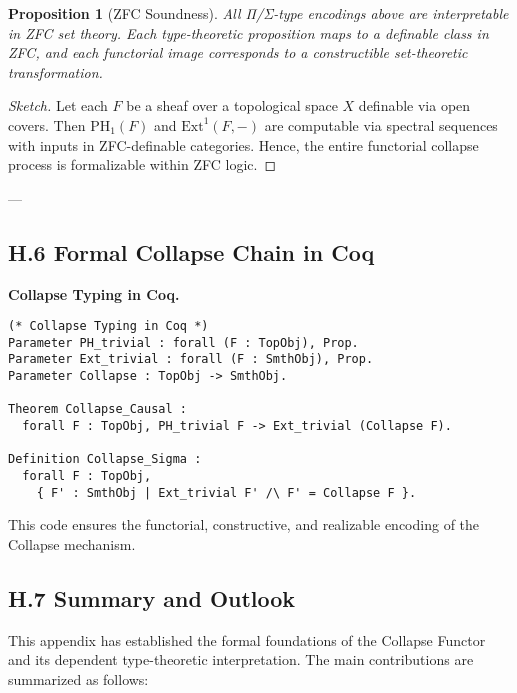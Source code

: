 \documentclass[11pt]{article}
\newtheorem{proposition}[theorem]{Proposition}
\begin{document}
\begin{proposition}[ZFC Soundness]
All Π/Σ-type encodings above are interpretable in ZFC set theory. Each type-theoretic proposition maps to a definable class in ZFC, and each functorial image corresponds to a constructible set-theoretic transformation.
\end{proposition}

\begin{proof}[Sketch]
Let each $F$ be a sheaf over a topological space $X$ definable via open covers. Then $\mathrm{PH}_1(F)$ and $\mathrm{Ext}^1(F,-)$ are computable via spectral sequences with inputs in ZFC-definable categories. Hence, the entire functorial collapse process is formalizable within ZFC logic.
\end{proof}

---

\subsection*{H.6 Formal Collapse Chain in Coq}

\textbf{Collapse Typing in Coq.}
\vspace{0.5em}

\begin{lstlisting}[language=Coq, mathescape=false]
(* Collapse Typing in Coq *)
Parameter PH_trivial : forall (F : TopObj), Prop.
Parameter Ext_trivial : forall (F : SmthObj), Prop.
Parameter Collapse : TopObj -> SmthObj.

Theorem Collapse_Causal :
  forall F : TopObj, PH_trivial F -> Ext_trivial (Collapse F).

Definition Collapse_Sigma :
  forall F : TopObj,
    { F' : SmthObj | Ext_trivial F' /\ F' = Collapse F }.
\end{lstlisting}

This code ensures the functorial, constructive, and realizable encoding of the Collapse mechanism.

\subsection*{H.7 Summary and Outlook}

This appendix has established the formal foundations of the Collapse Functor and its dependent type-theoretic interpretation. The main contributions are summarized as follows:
\end{document}

